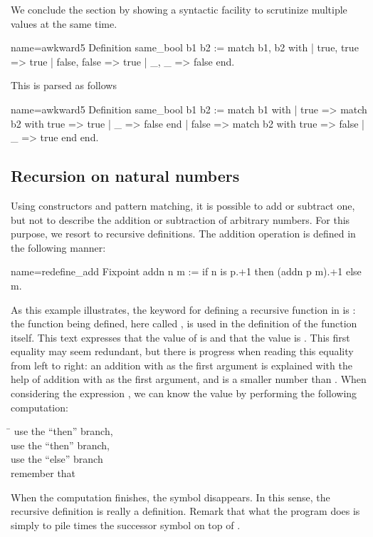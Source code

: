 We conclude the section by showing a syntactic facility to scrutinize
multiple values at the same time.

\begin{coq}{name=awkward5}{}
Definition same_bool b1 b2 :=
  match b1, b2 with
  | true, true => true
  | false, false => true
  | _, _ => false
  end.
\end{coq}

This is parsed as follows

\begin{coq}{name=awkward5}{}
Definition same_bool b1 b2 :=
  match b1 with
  | true => match b2 with true => true | _ => false end
  | false => match b2 with true => false | _ => true end
  end.
\end{coq}


\subsection{Recursion on natural numbers}\label{ssec:recnat}


Using constructors and pattern matching, it is possible to add or
subtract one, but not to describe the addition or subtraction of
arbitrary numbers. For this purpose, we resort to recursive
definitions. The addition operation is defined in the
following manner:

\begin{coq}{name=redefine_add}{}
Fixpoint addn n m :=
  if n is p.+1 then (addn p m).+1 else m.
\end{coq}
As this example illustrates, the keyword for defining a recursive
function in \Coq{} is : the function being
defined, here called , is used in the definition of the
function  itself.  This text expresses that the value of
 is
 and that the value  is .
This first equality may
seem redundant, but there is progress when reading this equality from
left to right: an addition with  as the first argument
is explained with the help of addition with  as the first
argument, and  is a smaller number than .  When considering the
expression , we can know the value by performing the following
computation:
\begin{tabbing}
\=\kill
{} \> use the ``then'' branch, \\
 \> use the ``then'' branch, \\
 \> use the ``else'' branch\\
\> remember that 
\end{tabbing}
When the computation finishes, the symbol  disappears.  In
this sense, the recursive definition is really a definition.  Remark that
what the  program does is simply to pile  times the
successor symbol on top of .

